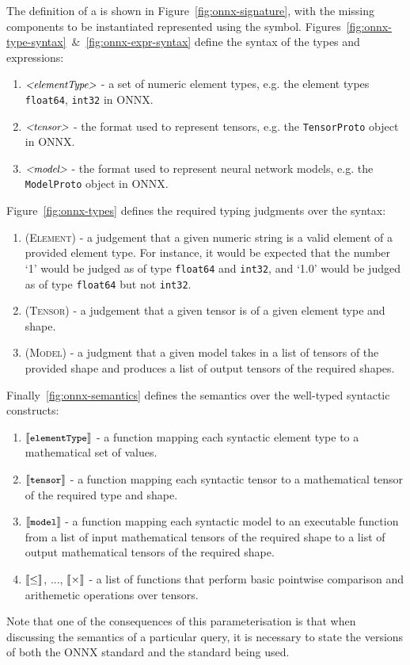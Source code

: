 The definition of a \networkTheory{} is shown in Figure~\ref{fig:onnx-signature}, with the missing components to be instantiated represented using the \missing{} symbol.
Figures~\ref{fig:onnx-type-syntax}~\&~\ref{fig:onnx-expr-syntax} define the syntax of the types and expressions:
\begin{enumerate}
\item $\text{\small \textit{<elementType>}}$ - a set of numeric element types, e.g. the element types \texttt{float64}, \texttt{int32} in ONNX.
\item $\text{\small \textit{<tensor>}}$ - the format used to represent tensors, e.g. the \texttt{TensorProto} object in ONNX.
\item $\text{\small \textit{<model>}}$ - the format used to represent neural network models, e.g. the \texttt{ModelProto} object in ONNX.
\end{enumerate}
Figure~\ref{fig:onnx-types} defines the required typing judgments over the syntax:
\begin{enumerate}
\item \textsc{(Element)} - a judgement that a given numeric string is a valid element of a provided element type. For instance, it would be expected that the number `1' would be judged as of type \texttt{float64} and \texttt{int32}, and `1.0' would be judged as of type \texttt{float64} but not \texttt{int32}.
\item \textsc{(Tensor)} - a judgement that a given tensor is of a given element type and shape.
\item \textsc{(Model)} - a judgment that a given model takes in a list of tensors of the provided shape and produces a list of output tensors of the required shapes.
\end{enumerate}
Finally~\ref{fig:onnx-semantics} defines the semantics over the well-typed syntactic constructs:
\begin{enumerate}
\item $\llbracket \texttt{\small elementType} \rrbracket$ - a function mapping each syntactic element type to a mathematical set of values.
\item $\llbracket \texttt{\small tensor} \rrbracket$ - a function mapping each syntactic tensor to a mathematical tensor of the required type and shape.
\item $\llbracket \texttt{\small model} \rrbracket$ - a function mapping each syntactic model to an executable function from a list of input mathematical tensors of the required shape to a list of output mathematical tensors of the required shape.
\item $\llbracket \leq \rrbracket$, ..., $\llbracket \times \rrbracket$ - a list of functions that perform basic pointwise comparison and arithemetic operations over tensors.
\end{enumerate}
Note that one of the consequences of this parameterisation is that when discussing the semantics of a particular \vnnlib{} query, it is necessary to state the versions of both the ONNX standard and the \vnnlib{} standard being used.